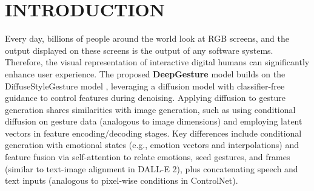 \section{INTRODUCTION}
\label{sec:introduction}

Every day, billions of people around the world look at RGB screens, and the output displayed on these screens is the output of any software systems. Therefore, the visual representation of interactive digital humans can significantly enhance user experience. The proposed \textbf{DeepGesture} model builds on the DiffuseStyleGesture model \citep{yang2023diffusestylegesture}, leveraging a diffusion model \citep{ho2020denoising} with classifier-free guidance \citep{ho2022classifier} to control features during denoising. Applying diffusion to gesture generation shares similarities with image generation, such as using conditional diffusion on gesture data (analogous to image dimensions) and employing latent vectors in feature encoding/decoding stages. Key differences include conditional generation with emotional states (e.g., emotion vectors and interpolations) and feature fusion via self-attention to relate emotions, seed gestures, and frames (similar to text-image alignment in DALL-E 2), plus concatenating speech and text inputs (analogous to pixel-wise conditions in ControlNet).






